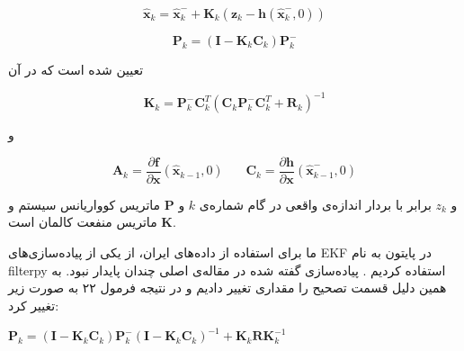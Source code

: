 \documentclass[11pt, fleqn]{article}
\begin{document}
\begin{multicols}{2}
\useshortskip
\begin{LTR}
\begin{equation}
\label{21}
\hat{\mathbf{x}}_{k} = \hat{\mathbf{x}}^{-}_{k}+\mathbf{K}_{k}(\mathbf{z}_k - \mathbf{h}(\hat{\mathbf{x}}^{-}_{k},0))
\end{equation}
\end{LTR}

\useshortskip
\begin{LTR}
\begin{equation}
\label{22}
\mathbf{P}_k = (\mathbf{I} - \mathbf{K}_{k} \mathbf{C}_{k}
)\mathbf{P}^{-}_{k}
\end{equation}
\end{LTR}

تعیین شده است که در آن


\useshortskip
\begin{LTR}
\begin{equation}
\label{23}
\mathbf{K}_k = \mathbf{P}^{-}_{k} \mathbf{C}^{T}_{k}(\mathbf{C}_{k}  \mathbf{P}^{-}_{k} \mathbf{C}^{T}_{k} + \mathbf{R}_k)^{-1}
\end{equation}
\end{LTR}

و


\useshortskip
\begin{LTR}
\begin{equation}
\label{24}
\mathbf{A}_k = \frac{\partial \mathbf{f}}{\partial \mathbf{x}}(\hat{\mathbf{x}}_{k-1},0) \ \ \ \ \ \ \ \ \mathbf{C}_k =  \frac{\partial \mathbf{h}}{\partial \mathbf{x}}(\hat{\mathbf{x}}^{-}_{k-1},0)
\end{equation}
\end{LTR}

و
$z_k$
برابر با بردار‌ اندازه‌ی واقعی در گام شماره‌ی
$k$
و
 $\mathbf{P}$ 
 ماتریس کوواریانس سیستم و 
  $\mathbf{K}$ 
   ماتریس منفعت کالمان 
  است. 


ما برای استفاده از داده‌های ایران، از یکی از پیاده‌سازی‌های 
EKF
در پایتون به نام 
filterpy
استفاده کردیم
\cite{s1}
. پیاده‌سازی گفته شده در مقاله‌ی اصلی چندان پایدار نبود. به همین دلیل قسمت تصحیح را مقداری تغییر دادیم و در نتیجه فرمول ۲۲ به صورت زیر تغییر کرد:

\begin{latin}
$\mathbf{P}_k = (\mathbf{I} - \mathbf{K}_{k} \mathbf{C}_{k}
)\mathbf{P}^{-}_{k} (\mathbf{I} - \mathbf{K}_{k} \mathbf{C}_{k}
)^{-1} + \mathbf{K}_k \mathbf{R} \mathbf{K}_k^{-1} $
\end{latin}


\end{multicols}
\end{document}
